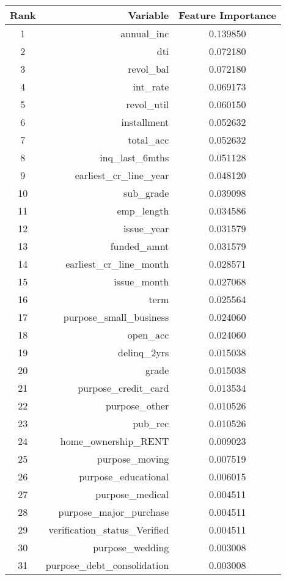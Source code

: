 \begin{table}[!ht]
\footnotesize
\centering

\begin{tabular}{crc}
\toprule
\textbf{Rank} & \textbf{Variable} & \textbf{Feature Importance} \\ \midrule
1 & annual\_inc & 0.139850 \\
2 & dti & 0.072180 \\
3 & revol\_bal & 0.072180 \\
4 & int\_rate & 0.069173 \\
5 & revol\_util & 0.060150 \\
6 & installment & 0.052632 \\
7 & total\_acc & 0.052632 \\
8 & inq\_last\_6mths & 0.051128 \\
9 & earliest\_cr\_line\_year & 0.048120 \\
10 & sub\_grade & 0.039098 \\
11 & emp\_length & 0.034586 \\
12 & issue\_year & 0.031579 \\
13 & funded\_amnt & 0.031579 \\
14 & earliest\_cr\_line\_month & 0.028571 \\
15 & issue\_month & 0.027068 \\
16 & term & 0.025564 \\
17 & purpose\_small\_business & 0.024060 \\
18 & open\_acc & 0.024060 \\
19 & delinq\_2yrs & 0.015038 \\
20 & grade & 0.015038 \\
21 & purpose\_credit\_card & 0.013534 \\
22 & purpose\_other & 0.010526 \\
23 & pub\_rec & 0.010526 \\
24 & home\_ownership\_RENT & 0.009023 \\
25 & purpose\_moving & 0.007519 \\
26 & purpose\_educational & 0.006015 \\
27 & purpose\_medical & 0.004511 \\
28 & purpose\_major\_purchase & 0.004511 \\
29 & verification\_status\_Verified & 0.004511 \\
30 & purpose\_wedding & 0.003008 \\
31 & purpose\_debt\_consolidation & 0.003008 \\

\end{tabular}
\end{table}
